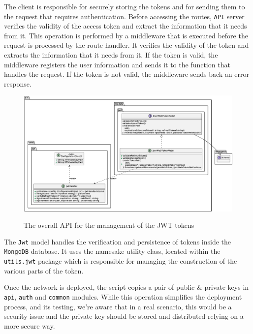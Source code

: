 \documentclass{scrartcl}
\begin{document}

The client is responsible for securely storing the tokens and for sending them to the request that requires authentication. Before accessing the routes, \texttt{API} server verifies the validity of the access token and extract 
the information that it needs from it.
This operation is performed by a middleware that is executed before the request is processed by the route handler. It verifies the validity of the token and extracts the information that it needs from it. If the token is valid, the middleware registers the user information and sends it to the function that handles the request. If the token is not valid, the middleware sends back an error response.


\begin{figure}
    \centering
    \includegraphics[width=\linewidth]{figures/jwt-api.eps}
    \label{fig:jwt-packages-api} 
    \caption{The overall API for the management of the JWT tokens}
\end{figure}

The \texttt{Jwt} model handles the verification and persistence of tokens inside the \texttt{MongoDB} database. It uses the namesake utility class, located within the \texttt{utils.jwt} package which is responsible for managing the construction of the various parts of the token.

\begin{warn}
    Once the network is deployed, the script copies a pair of public \& private keys in \texttt{api}, \texttt{auth} and \texttt{common} modules. While this operation simplifies the deployment process, and its testing, we're aware that in a real scenario, this would be a security issue and the private key should be stored and distributed relying on a more secure way.
\end{warn}
\end{document}
